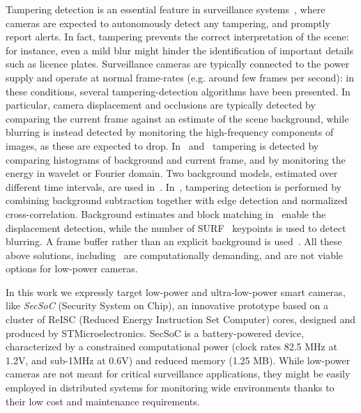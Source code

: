 \documentclass{llncs}
\begin{document}
Tampering detection is an essential feature in surveillance systems~\cite{hampapur2005smart}, where cameras are expected to autonomously detect any tampering, and promptly report alerts. In fact, tampering prevents the correct interpretation of the scene: for instance, even a mild blur might hinder the identification of important details such as licence plates. Surveillance cameras are typically connected to the power supply and operate at normal frame-rates (e.g. around few frames per second): in these conditions, several tampering-detection algorithms have been presented. In particular, camera displacement and occlusions are typically detected by comparing the current frame against an estimate of the scene background, while blurring is instead detected by monitoring the high-frequency components of images, as these are expected to drop. In~\cite{aksay2007camera} and~\cite{saglam2009real} tampering is detected by comparing histograms of background and current frame, and by monitoring the energy in wavelet or Fourier domain. Two background models, estimated over different time intervals, are used in~\cite{saglam2009real}. In~\cite{gil2007automatic}, tampering detection is performed by combining background subtraction together with edge detection and normalized cross-correlation. Background estimates and block matching in~\cite{tsesmelis2013tamper} enable the displacement detection, while the number of SURF~\cite{bay2006surf} keypoints is used to detect blurring. A frame buffer rather than an explicit background is used~\cite{ribnick2006real}. All these above solutions, including~\cite{harasse2004automated,kryjak2012fpga} are computationally demanding, and are not viable options for low-power cameras.

In this work we expressly target low-power and ultra-low-power smart cameras, like \emph{SecSoC} (Security System on Chip), an innovative prototype based on a cluster of ReISC (Reduced Energy Instruction Set Computer) cores, designed and produced by STMicroelectronics. SecSoC is a battery-powered device, characterized by a constrained computational power (clock rates 82.5 MHz at 1.2V, and sub-1MHz at 0.6V) and reduced memory (1.25 MB). While low-power cameras are not meant for critical surveillance applications, they might be easily employed in distributed systems for monitoring wide environments thanks to their low cost and maintenance requirements.  %
\end{document}

